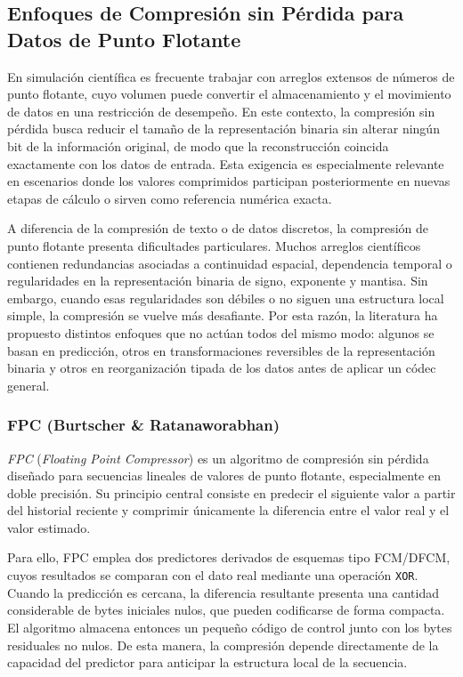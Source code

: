 \subsection{Enfoques de Compresión sin Pérdida para Datos de Punto Flotante}

En simulación científica es frecuente trabajar con arreglos extensos de números de
punto flotante, cuyo volumen puede convertir el almacenamiento y el movimiento de
datos en una restricción de desempeño. En este contexto, la compresión sin pérdida
busca reducir el tamaño de la representación binaria sin alterar ningún bit de la
información original, de modo que la reconstrucción coincida exactamente con los datos
de entrada. Esta exigencia es especialmente relevante en escenarios donde los valores
comprimidos participan posteriormente en nuevas etapas de cálculo o sirven como
referencia numérica exacta.

A diferencia de la compresión de texto o de datos discretos, la compresión de punto
flotante presenta dificultades particulares. Muchos arreglos científicos contienen
redundancias asociadas a continuidad espacial, dependencia temporal o regularidades en
la representación binaria de signo, exponente y mantisa. Sin embargo, cuando esas
regularidades son débiles o no siguen una estructura local simple, la compresión se
vuelve más desafiante. Por esta razón, la literatura ha propuesto distintos enfoques que
no actúan todos del mismo modo: algunos se basan en predicción, otros en
transformaciones reversibles de la representación binaria y otros en reorganización
tipada de los datos antes de aplicar un códec general.

\subsubsection{FPC (Burtscher \& Ratanaworabhan)}

\textit{FPC} (\emph{Floating Point Compressor})\parencite{burtscher2009fpc} es un algoritmo
de compresión sin pérdida diseñado para secuencias lineales de valores de punto
flotante, especialmente en doble precisión. Su principio central consiste en predecir el
siguiente valor a partir del historial reciente y comprimir únicamente la diferencia entre el
valor real y el valor estimado.

Para ello, FPC emplea dos predictores derivados de esquemas tipo FCM/DFCM, cuyos
resultados se comparan con el dato real mediante una operación \texttt{XOR}. Cuando la
predicción es cercana, la diferencia resultante presenta una cantidad considerable de
bytes iniciales nulos, que pueden codificarse de forma compacta. El algoritmo almacena
entonces un pequeño código de control junto con los bytes residuales no nulos. De esta
manera, la compresión depende directamente de la capacidad del predictor para anticipar
la estructura local de la secuencia.

